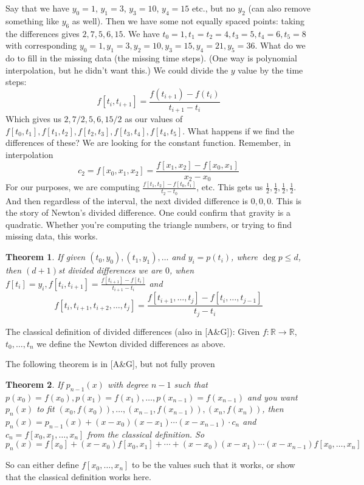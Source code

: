 \documentclass{article}
\theoremstyle{plain}
\newtheorem{theorem}{Theorem}
\theoremstyle{remark}
\newcommand{\R}{{\mathbb R}}
\begin{document}
Say that we have $y_0 = 1$, $y_1 = 3$, $y_3 = 10$, $y_4 = 15$ etc.,
but no $y_2$ (can also remove something like $y_6$ as well).
Then we have some not equally spaced points:
taking the differences gives $2,7,5,6,15$.
We have
$t_0 = 1, t_1 = t_2 = 4, t_3 = 5, t_4 = 6, t_5 = 8$
with corresponding $y_0 = 1, y_1 = 3, y_2 = 10, y_3 = 15, y_4 = 21, y_5 = 36$.
What do we do to fill in the missing data (the missing time steps).
(One way is polynomial interpolation, but he didn't want this.)
We could divide the $y$ value by the time steps:
\[
	f[t_i,t_{i+1}] = \frac{f(t_{i+1}) - f(t_i)}{t_{i+1} - t_i}
\]
Which gives us $2, 7/2, 5, 6, 15/2$ as our values of
$f[t_0,t_1], f[t_1,t_2], f[t_2,t_3], f[t_3,t_4], f[t_4,t_5]$.
What happens if we find the differences of these?
We are looking for the constant function.
Remember, in interpolation
\[
	c_2 = f[x_0,x_1,x_2] = \frac{f[x_1,x_2] - f[x_0,x_1]}{x_2 - x_0}
\]
For our purposes, we are computing $\frac{f[t_1,t_2] - f[t_0,t_1]}{t_2 - t_0}$, etc.
This gets us $\frac12,\frac12,\frac12,\frac12$.
And then regardless of the interval, the next divided difference is $0,0,0$.
This is the story of Newton's divided difference.
One could confirm that gravity is a quadratic.
Whether you're computing the triangle numbers,
or trying to find missing data, this works.
\begin{theorem}
	If given $(t_0,y_0),(t_1,y_1),\dots$
	and $y_i = p(t_i)$, where $\deg{p} \leq d$,
	then $(d+1)$st divided differences we are $0$,
	when $f[t_i] = y_i, f[t_i,t_{i+1}] = \frac{f[t_{i+1}] - f[t_i]}{t_{i+1} - t_i}$ and
	\[
		f[t_i,t_{i+1},t_{i+2},\dots,t_j]
		= \frac{f[t_{i+1},\dots,t_j] - f[t_i,\dots,t_{j-1}]}{t_j - t_i}
	\]
\end{theorem}

The classical definition of divided differences (also in [A\&G]):
Given $f \colon \R \to \R$, $t_0,\dots,t_n$ we define the Newton divided differences as above.

The following theorem is in [A\&G], but not fully proven
\begin{theorem}
	If $p_{n-1}(x)$ with degree $n-1$ such that
	$p(x_0) = f(x_0), p(x_1) = f(x_1), \dots, p(x_{n-1}) = f(x_{n-1})$
	and you want $p_n(x)$ to fit $(x_0,f(x_0)),\dots,(x_{n-1},f(x_{n-1})),(x_n,f(x_n))$,
	then $p_n(x) = p_{n-1}(x) + (x-x_0)(x-x_1)\cdots(x-x_{n-1})\cdot c_n$
	and $c_n = f[x_0,x_1,\dots,x_n]$ from the classical definition. So
	\[
		p_n(x) = f[x_0] + (x-x_0)f[x_0,x_1] + \cdots
		+ (x-x_0)(x-x_1)\cdots(x-x_{n-1})f[x_0,\dots,x_n]
	\]
\end{theorem}
So can either define $f[x_0,\dots,x_n]$ to be the values such that it works,
or show that the classical definition works here.
\end{document}
